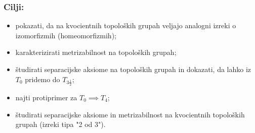\documentclass[a4paper, 12pt]{beamer}
\begin{document}
\begin{frame}
\frametitle{Cilji:}
\begin{itemize}[label=]
\item<1-> pokazati, da na kvocientnih topoloških grupah veljajo analogni izreki o izomorfizmih (homeomorfizmih);
\item<2-> karakterizirati metrizabilnost na topoloških grupah;
\item<3-> študirati separacijske aksiome na topoloških grupah in dokazati, da lahko iz $T_0$ pridemo do $T_{3 \frac{1}{2}}$;
\item<4-> najti protiprimer za $T_0 \implies T_4$;
\item<5-> študirati separacijske aksiome in metrizabilnost na kvocientnih topoloških grupah (izreki tipa "2 od 3").
\end{itemize}
\end{frame}
\end{document}
